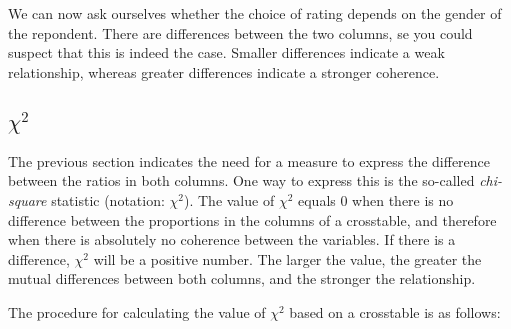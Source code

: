 We can now ask ourselves whether the choice of rating depends on the gender of the repondent. There are differences between the two columns, se you could suspect that this is indeed the case. Smaller differences indicate a weak relationship, whereas greater differences indicate a stronger coherence.

\subsection{\texorpdfstring{$\chi^{2}$}{chi-square}}
\label{ssec:chi-square}

The previous section indicates the need for a measure to express the difference between the ratios in both columns. One way to express this is the so-called \emph{chi-square} statistic (notation: $\chi^{2}$). The value of $\chi^2$ equals 0 when there is no difference between the proportions in the columns of a crosstable, and therefore when there is absolutely no coherence between the variables. If there is a difference, $\chi^2$ will be a positive number. The larger the value, the greater the mutual differences between both columns, and the stronger the relationship.

The procedure for calculating the value of $\chi^2$ based on a crosstable is as follows:

